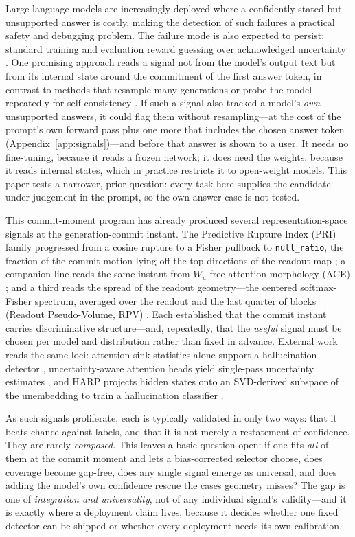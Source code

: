 \documentclass[11pt]{article}
\begin{document}
Large language models are increasingly deployed where a confidently stated but unsupported answer
is costly, making the detection of such failures a practical safety and debugging problem. The
failure mode is also expected to persist: standard training and evaluation reward guessing over
acknowledged uncertainty \cite{kalai2025hallucinate}. One promising approach reads a
signal not from the model's output text but from its internal state around the commitment of
the first answer token, in contrast to methods that resample many generations or probe the model
repeatedly for self-consistency
\cite{farquhar2024semantic,agrawal2024references,wastl2025selfconsistency}. If such a signal also tracked a
model's \emph{own} unsupported answers, it could flag them without resampling---at the cost of the
prompt's own forward pass plus one more that includes the chosen answer token
(Appendix~\ref{app:signals})---and before that answer is shown to a user. It needs no fine-tuning, because it reads a frozen network; it does need
the weights, because it reads internal states, which in practice restricts it to open-weight models.
This paper tests a narrower, prior question: every task here supplies the candidate under judgement
in the prompt, so the own-answer case is not tested.

This commit-moment program has already produced several representation-space signals at the
generation-commit instant. The Predictive Rupture Index (PRI) family progressed from a cosine
rupture to a Fisher pullback to \texttt{null\_ratio}, the fraction of the commit motion lying off
the top directions of the readout map \cite{pri}; a companion line reads the same instant from
$W_u$-free attention morphology (ACE) \cite{ace}; and a third reads the spread of the readout
geometry---the centered softmax-Fisher spectrum, averaged over the readout and the last quarter of
blocks (Readout Pseudo-Volume, RPV) \cite{rpv}. Each established that the commit
instant carries discriminative structure---and, repeatedly, that the \emph{useful} signal must be
chosen per model and distribution rather than fixed in advance. External work reads the same loci:
attention-sink statistics \cite{xiao2024sinks} alone support a hallucination detector
\cite{binkowski2026sinks}, uncertainty-aware attention heads yield single-pass uncertainty
estimates \cite{vazhentsev2025rauq}, and HARP projects hidden states onto an SVD-derived subspace
of the unembedding to train a hallucination classifier \cite{hu2025harp}.

As such signals proliferate, each is typically validated in only two ways: that it beats chance
against labels, and that it is not merely a restatement of confidence. They are rarely
\emph{composed}. This leaves a basic question open: if one fits \emph{all} of them at the commit
moment and lets a bias-corrected selector choose, does coverage become gap-free, does any single signal
emerge as universal, and does adding the model's own confidence rescue the cases geometry
misses? The gap is one of \emph{integration and universality}, not of any individual signal's
validity---and it is exactly where a deployment claim lives, because it decides whether one fixed
detector can be shipped or whether every deployment needs its own calibration.
\end{document}
